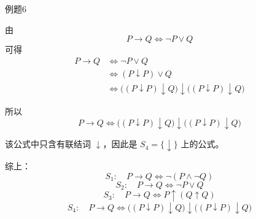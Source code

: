 \begin{question}{例题6}
\begin{enumerate}
		由
		\[
		P\to Q \Leftrightarrow \neg P\lor Q
		\]
		可得
		\begin{align*}
			P\to Q
			&\Leftrightarrow \neg P\lor Q \\
			&\Leftrightarrow (P\downarrow P)\lor Q \\
			&\Leftrightarrow \bigl((P\downarrow P)\downarrow Q\bigr)
			\downarrow
			\bigl((P\downarrow P)\downarrow Q\bigr)
		\end{align*}
		
		所以
		\[
		\boxed{
			P\to Q \Leftrightarrow 
			\bigl((P\downarrow P)\downarrow Q\bigr)
			\downarrow
			\bigl((P\downarrow P)\downarrow Q\bigr)
		}
		\]
		
		该公式中只含有联结词 \(\downarrow\)，因此是 \(S_4=\{\downarrow\}\) 上的公式。
	\end{enumerate}
	
	综上：
	\[
	\boxed{
		S_1:\quad P\to Q \Leftrightarrow \neg(P\land \neg Q)
	}
	\]
	\[
	\boxed{
		S_2:\quad P\to Q \Leftrightarrow \neg P\lor Q
	}
	\]
	\[
	\boxed{
		S_3:\quad P\to Q \Leftrightarrow P\uparrow(Q\uparrow Q)
	}
	\]
	\[
	\boxed{
		S_4:\quad P\to Q \Leftrightarrow 
		\bigl((P\downarrow P)\downarrow Q\bigr)
		\downarrow
		\bigl((P\downarrow P)\downarrow Q\bigr)
	}
	\]
	
	
\end{question}
